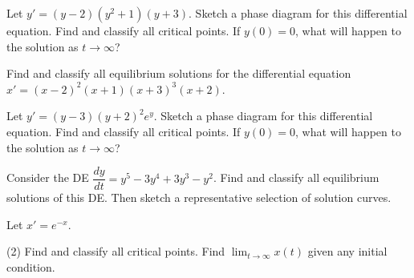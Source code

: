 \documentclass{ximera}
\begin{document}
\begin{exercise}
    Let $y' = (y-2)(y^2 + 1)(y+3)$. Sketch a phase diagram for this differential equation. Find and classify all critical points. If $y(0) = 0$, what will happen to the solution as $t \rightarrow \infty$?
\end{exercise}

\begin{exercise}
    Find and classify all equilibrium solutions for the differential equation $x' = (x-2)^2(x+1)(x+3)^3(x+2)$.
\end{exercise}


\begin{exercise}
    Let $y' = (y-3)(y+2)^2e^y$. Sketch a phase diagram for this differential equation. Find and classify all critical points. If $y(0) = 0$, what will happen to the solution as $t \rightarrow \infty$?
\end{exercise}

\begin{exercise}
    Consider the DE $\dfrac{dy}{dt}=y^5-3y^4+3y^3-y^2$. %
    Find and classify all equilibrium solutions of this DE. Then sketch a representative selection of solution curves.
\end{exercise}

\begin{exercise}
    Let $x'=e^{-x}$.
    \begin{tasks}(2)
        \task Find and classify all critical points.
        \task Find $\displaystyle \lim_{t\to\infty} x(t)$ given any initial condition.
    \end{tasks}
\end{exercise}

\end{document}
